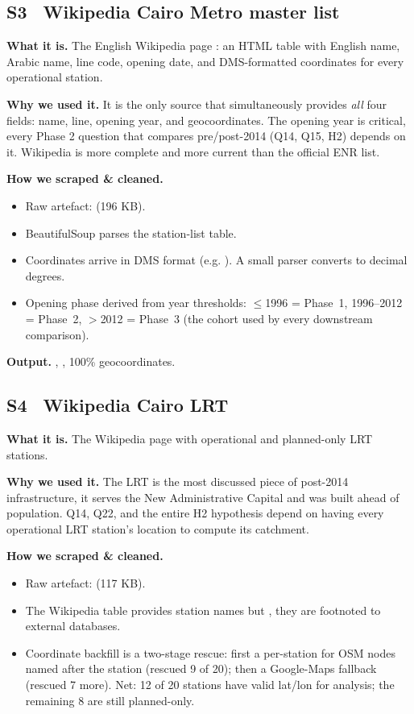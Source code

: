 \subsection{S3 \textbullet\ Wikipedia Cairo Metro master list}

\textbf{What it is.} The English Wikipedia page
: an HTML table with English
name, Arabic name, line code, opening date, and DMS-formatted
coordinates for every operational station.

\textbf{Why we used it.} It is the only source that simultaneously
provides \emph{all} four fields: name, line, opening year, and
geocoordinates. The opening year is critical, every Phase 2 question
that compares pre/post-2014 (Q14, Q15, H2) depends on it. Wikipedia
is more complete and more current than the official ENR list.

\textbf{How we scraped \& cleaned.}
\begin{itemize}
 \item Raw artefact:  (196 KB).
 \item BeautifulSoup parses the station-list table.
 \item Coordinates arrive in DMS format (e.g. ). A small parser converts to decimal degrees.
 \item Opening phase derived from year thresholds:
 $\le$1996 = Phase~1, 1996--2012 = Phase~2,
 $>$2012 = Phase~3 (the  cohort used by every
 downstream comparison).
\end{itemize}

\textbf{Output.} , , 100\%
geocoordinates.

\subsection{S4 \textbullet\ Wikipedia Cairo LRT}

\textbf{What it is.} The Wikipedia page 
with operational and planned-only LRT stations.

\textbf{Why we used it.} The LRT is the most discussed
piece of post-2014 infrastructure, it serves the New Administrative
Capital and was built ahead of population. Q14, Q22, and the entire
H2 hypothesis depend on having every operational LRT station's location
to compute its catchment.

\textbf{How we scraped \& cleaned.}
\begin{itemize}
 \item Raw artefact:  (117 KB).
 \item The Wikipedia table provides station names but , they are footnoted to external
 databases.
 \item Coordinate backfill is a two-stage rescue: first a per-station
  for OSM nodes named after the station
 (rescued 9 of 20); then a Google-Maps fallback (rescued 7
 more). Net: 12 of 20 stations have valid lat/lon for analysis;
 the remaining 8 are still planned-only.
\end{itemize}

